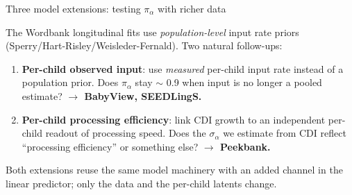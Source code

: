 \documentclass[
  ignorenonframetext,
  aspectratio=169,
  t]{beamer}
\providecommand{\tightlist}{%
  \setlength{\itemsep}{0pt}\setlength{\parskip}{0pt}}
\newcommand{\pia}{\pi_{\alpha}}
\begin{document}
\begin{frame}{Three model extensions: testing \(\pia\) with richer data}
\label{three-model-extensions-testing-pia-with-richer-data}
\small

The Wordbank longitudinal fits use \emph{population-level} input rate
priors (Sperry/Hart-Risley/Weisleder-Fernald). Two natural follow-ups:

\vspace{0.6em}

\begin{enumerate}
\tightlist
\item
  \textbf{Per-child observed input}: use \emph{measured} per-child input
  rate instead of a population prior. Does \(\pia\) stay \(\sim\) 0.9
  when input is no longer a pooled estimate? \textbf{\(\to\) BabyView,
  SEEDLingS.}
\item
  \textbf{Per-child processing efficiency}: link CDI growth to an
  independent per-child readout of processing speed. Does the
  \(\sigma_\alpha\) we estimate from CDI reflect ``processing
  efficiency'' or something else? \textbf{\(\to\) Peekbank.}
\end{enumerate}

\vspace{0.6em}

Both extensions reuse the same model machinery with an added channel in
the linear predictor; only the data and the per-child latents change.
\end{frame}
\end{document}
